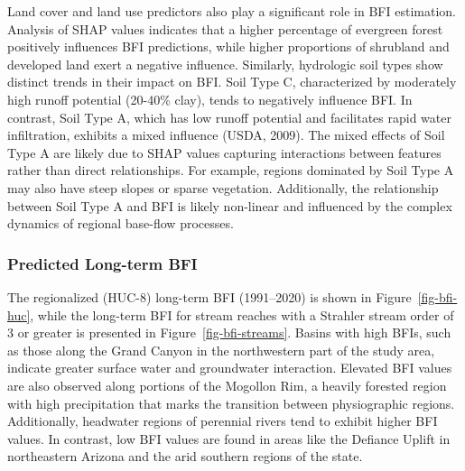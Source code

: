 \documentclass[
]{agujournal2019}
\begin{document}
Land cover and land use predictors also play a significant role in BFI
estimation. Analysis of SHAP values indicates that a higher percentage
of evergreen forest positively influences BFI predictions, while higher
proportions of shrubland and developed land exert a negative influence.
Similarly, hydrologic soil types show distinct trends in their impact on
BFI. Soil Type C, characterized by moderately high runoff potential
(20-40\% clay), tends to negatively influence BFI. In contrast, Soil
Type A, which has low runoff potential and facilitates rapid water
infiltration, exhibits a mixed influence (USDA, 2009). The mixed effects
of Soil Type A are likely due to SHAP values capturing interactions
between features rather than direct relationships. For example, regions
dominated by Soil Type A may also have steep slopes or sparse
vegetation. Additionally, the relationship between Soil Type A and BFI
is likely non-linear and influenced by the complex dynamics of regional
base-flow processes.

\subsubsection{Predicted Long-term BFI}\label{predicted-long-term-bfi}

The regionalized (HUC-8) long-term BFI (1991--2020) is shown in
Figure~\ref{fig-bfi-huc}, while the long-term BFI for stream reaches
with a Strahler stream order of 3 or greater is presented in
Figure~\ref{fig-bfi-streams}. Basins with high BFIs, such as those along
the Grand Canyon in the northwestern part of the study area, indicate
greater surface water and groundwater interaction. Elevated BFI values
are also observed along portions of the Mogollon Rim, a heavily forested
region with high precipitation that marks the transition between
physiographic regions. Additionally, headwater regions of perennial
rivers tend to exhibit higher BFI values. In contrast, low BFI values
are found in areas like the Defiance Uplift in northeastern Arizona and
the arid southern regions of the state.
\end{document}
